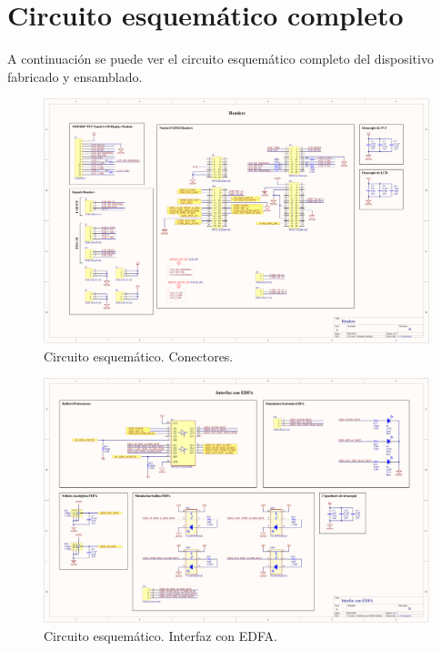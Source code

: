 
\chapter{Circuito esquemático completo} %

\label{AppendixA} %

A continuación se puede ver el circuito esquemático completo del dispositivo fabricado y ensamblado.

\begin{figure}[H]
\centering
\includegraphics[width=1.7\textwidth]{./Figures/circ1.png}
\caption{Circuito esquemático. Conectores.}
\end{figure}

\begin{figure}[H]
\centering
\includegraphics[width=1.7\textwidth]{./Figures/circ2.png}
\caption{Circuito esquemático. Interfaz con EDFA.}
\end{figure}

